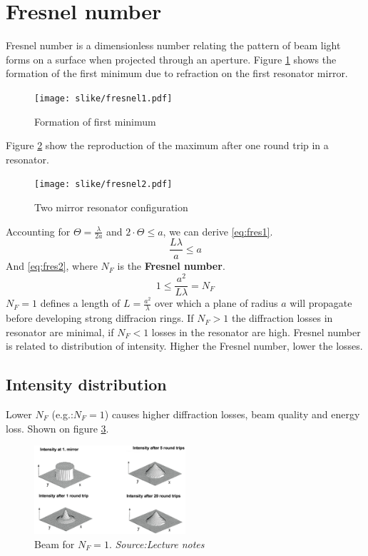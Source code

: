 \section{Fresnel number}
Fresnel number is a dimensionless number relating the pattern of beam light forms on a 
surface when projected through an aperture. Figure \ref{fig:fresnel1} shows the formation of the first minimum 
due to refraction on the first resonator mirror.

\begin{figure}[h!]
    \centering
    \texttt{[image: slike/fresnel1.pdf]}
    \caption{Formation of first minimum}
    \label{fig:fresnel1}
\end{figure}

Figure \ref{fig:fresnel2} show the reproduction of the maximum after one round trip in a resonator.
\begin{figure}[h!]
    \centering
    \texttt{[image: slike/fresnel2.pdf]}
    \caption{Two mirror resonator configuration}
    \label{fig:fresnel2}
\end{figure}

Accounting for $\Theta = \frac{\lambda}{2a}$ and $2 \cdot \Theta \le a$, we can derive \ref{eq:fres1}.
\begin{equation}
    \frac{L\lambda}{a} \le a
    \label{eq:fres1}
\end{equation}
And \ref{eq:fres2}, where $N_F$ is the \textbf{Fresnel number}.
\begin{equation}
    1 \le \frac{a^2}{L \lambda} = N_F
    \label{eq:fres2}
\end{equation}
$N_F = 1$ defines a length of $L=\frac{a^2}{\lambda}$ over which a plane of radius $a$ will propagate before developing strong diffracion rings.
If $N_F > 1$ the diffraction losses in resonator are minimal, if $N_F < 1$ losses in the resonator are high.
Fresnel number is related to distribution of intensity. Higher the Fresnel number, lower the losses.

\subsection{Intensity distribution}

Lower $N_F$ (e.g.:$N_F=1$) causes higher diffraction losses, beam quality and energy loss. Shown on figure \ref{fig:fbq1}.
 
\begin{figure}[h!]
    \centering
    \includegraphics[width=0.5\textwidth]{slike/fbq1.png}
    \caption{Beam for $N_F=1$. \textit{Source:Lecture notes}}
    \label{fig:fbq1}
\end{figure}

